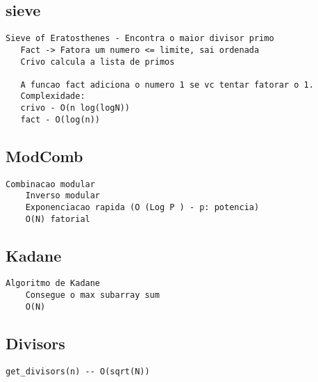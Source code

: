 \vspace{-2pt}
\subsection{sieve}
\vspace{-4pt}
\begin{lstlisting}[style=description]
   Sieve of Eratosthenes - Encontra o maior divisor primo
   Fact -> Fatora um numero <= limite, sai ordenada
   Crivo calcula a lista de primos
   
   A funcao fact adiciona o numero 1 se vc tentar fatorar o 1.
   Complexidade:
   crivo - O(n log(logN))
   fact - O(log(n))

\end{lstlisting}
\vspace{-5pt}
\raggedbottom
\hrulefill

\vspace{-2pt}
\subsection{ModComb}
\vspace{-4pt}
\begin{lstlisting}[style=description]
    Combinacao modular
    Inverso modular
    Exponenciacao rapida (O (Log P ) - p: potencia)
    O(N) fatorial

\end{lstlisting}
\vspace{-5pt}
\raggedbottom
\hrulefill

\vspace{-2pt}
\subsection{Kadane}
\vspace{-4pt}
\begin{lstlisting}[style=description]
    Algoritmo de Kadane
    Consegue o max subarray sum
    O(N)  

\end{lstlisting}
\vspace{-5pt}
\raggedbottom
\hrulefill

\vspace{-2pt}
\subsection{Divisors}
\vspace{-4pt}
\begin{lstlisting}[style=description]
    get_divisors(n) -- O(sqrt(N))

\end{lstlisting}
\vspace{-5pt}
\raggedbottom
\hrulefill


